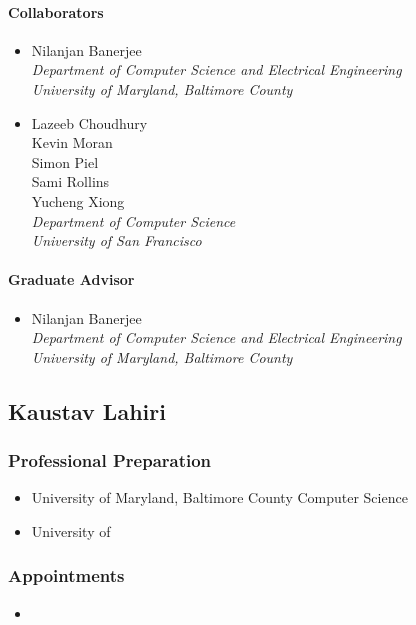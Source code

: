       \paragraph{Collaborators}
	\begin{itemize}
          \item Nilanjan Banerjee\\
            \textit{Department of Computer Science and Electrical Engineering
              \\University of Maryland, Baltimore County}
          \item Lazeeb Choudhury\\
            Kevin Moran\\
            Simon Piel\\
            Sami Rollins\\
            Yucheng Xiong\\
            \textit{Department of Computer Science\\University of San
	      Francisco}
        \end{itemize}
      \paragraph{Graduate Advisor}
	\begin{itemize}
          \item Nilanjan Banerjee\\
            \textit{Department of Computer Science and Electrical Engineering\\
              University of Maryland, Baltimore County}
        \end{itemize}
  \subsection{Kaustav Lahiri}
    \subsubsection{Professional Preparation}
      \begin{itemize}
        \item University of Maryland, Baltimore County \hspace{20pt} Computer
	  Science \hfill 
	\item University of \hfill 
      \end{itemize}
    \subsubsection{Appointments}
      \begin{itemize}
        \item 
      \end{itemize}

